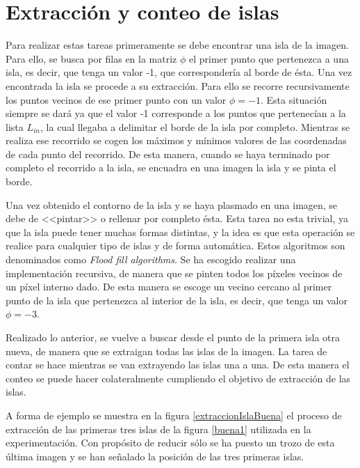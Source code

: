 \section{Extracci\'{o}n y conteo de islas}

Para realizar estas tareas primeramente se debe encontrar una isla de la imagen. Para ello, se busca por filas en la matriz $\phi$ el primer punto que pertenezca a una isla, es decir, que tenga un valor -1, que corresponder\'{i}a al borde de \'{e}sta. Una vez encontrada la isla se procede a su extracci\'{o}n. Para ello se recorre recursivamente los puntos vecinos de ese primer punto con un valor $\phi = -1$. Esta situaci\'{o}n siempre se dar\'{a} ya que el valor -1 corresponde a los puntos que pertenec\'{i}an a la lista $L_{in}$, la cual llegaba a delimitar el borde de la isla por completo. Mientras se realiza ese recorrido se cogen los m\'{a}ximos y m\'{i}nimos valores de las coordenadas de cada punto del recorrido. De esta manera, cuando se haya terminado por completo el recorrido a la isla, se encuadra en una imagen la isla y se pinta el borde.

Una vez obtenido el contorno de la isla y se haya plasmado en una imagen, se debe de <<pintar>> o rellenar por completo \'{e}sta. Esta tarea no esta trivial, ya que la isla puede tener muchas formas distintas, y la idea es que esta operaci\'{o}n se realice para cualquier tipo de islas y de forma autom\'{a}tica. Estos algoritmos son denominados como \textit{Flood fill algorithms}. Se ha escogido realizar una implementaci\'{o}n recursiva, de manera que se pinten todos los p\'{i}xeles vecinos de un p\'{i}xel interno dado. De esta manera se escoge un vecino cercano al primer punto de la isla que pertenezca al interior de la isla, es decir, que tenga un valor $\phi = -3$.

Realizado lo anterior, se vuelve a buscar desde el punto de la primera isla otra nueva, de manera que se extraigan todas las islas de la imagen. La tarea de contar se hace mientras se van extrayendo las islas una a una. De esta manera el conteo se puede hacer colateralmente cumpliendo el objetivo de extracci\'{o}n de las islas.

A forma de ejemplo se muestra en la figura \ref{extraccionIslaBuena} el proceso de extracci\'{o}n de las primeras tres islas de la figura \ref{buena1} utilizada en la experimentaci\'{o}n. Con prop\'{o}sito de reducir s\'{o}lo se ha puesto un trozo de esta \'{u}ltima imagen y se han se\~{n}alado la posici\'{o}n de las tres primeras islas.


